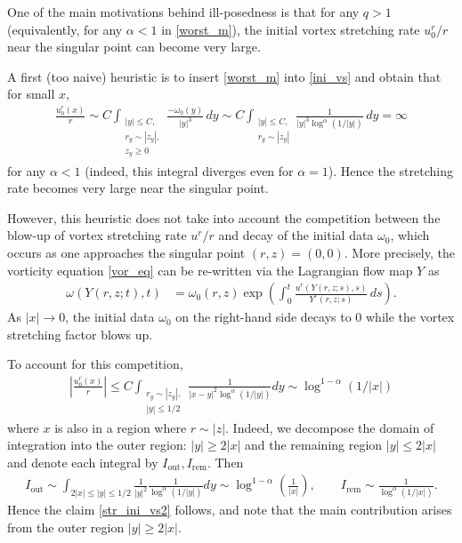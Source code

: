 \documentclass[reqno,11pt]{amsart}
\begin{document}
One of the main motivations behind ill-posedness is that for any $q>1$ (equivalently,
for any $\alpha<1$ in \eqref{worst_m}), the initial vortex stretching rate $u^r_0/r$ near the singular point can become very large.

A first (too naive) heuristic is to insert \eqref{worst_m} into \eqref{ini_vs} and obtain that for small $x$,
\begin{align*}
    \frac{u_0^r(x)}{r}
    \sim C \int_{\substack{|y|\le C,\\r_y \sim |z_y|,\\z_y\geq 0}}\frac{-\omega_0(y)}{|y|^3}\,dy
    \sim C\int_{\substack{|y|\le C,\\ r_y\sim |z_y|}}\frac{1}{|y|^3\log^\alpha(1/|y|)}\,dy=\infty
\end{align*}
 for any $\alpha<1$ (indeed, this integral diverges even for $\alpha=1$). Hence the stretching rate becomes very large near the singular point. 



However, this heuristic does not take into account the competition between the blow-up of vortex stretching rate $u^r/r$ and decay of the initial data $\omega_0$, which occurs as one approaches  the singular point $(r,z)=(0,0)$.
More precisely, the vorticity equation \eqref{vor_eq} can be re-written via the Lagrangian flow map $Y$ as
    \begin{align}
    \label{Cauchy_for}
          \omega(Y(r,z;t),t)
    &=
        \omega_0 (r,z) 
        \exp\left(\int_0^t \frac{u^r(Y(r,z;s),s)}{Y^r(r,z;s)} \, ds \right).
    \end{align}
As $|x|\to 0$, the initial data $\omega_0$ on the right-hand side decays to $0$ while the vortex stretching factor blows up.


To account for this competition, 
    \begin{align}
    \label{str_ini_vs2}
        \left| \frac{u^r_0(x)}{r} \right|
        \leq
        C\int_{\substack{r_y\sim |z_y|, \\ |y|\leq 1/2}} \frac{1}{|x-y|^2 \log ^{\alpha}(1/|y|)} dy\sim \log ^{1-\alpha} (1/|x|) 
    \end{align}
where $x$ is also in a region where $r\sim |z|$.
Indeed, we decompose the domain of integration into the outer region: $|y|\geq 2 |x|$ and the remaining region $|y|\leq 2|x|$ and  denote each integral by $I_{\mathrm{out}}, I_{\mathrm{rem}}$. Then
    \begin{align*}
        I_{\mathrm{out}}\sim 
        \int_{2|x|\leq |y|\leq1/2} \frac{1}{|y|^2} \frac{1}{\log^\alpha (1/|y|)}dy\sim \log ^{1-\alpha} \left( \frac{1}{|x|} \right), 
    \qquad
        I_{\mathrm{rem}} 
        \sim \frac{1}{\log^{\alpha} (1/|x|)}.
    \end{align*}
Hence the claim \eqref{str_ini_vs2} follows, and note that the main contribution arises from the outer region $|y|\geq 2 |x|.$
\end{document}
